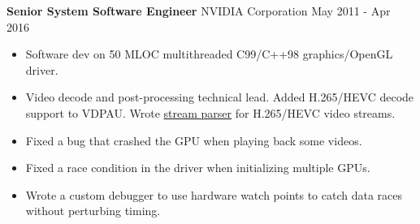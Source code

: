 \textbf{Senior System Software Engineer} NVIDIA Corporation \hfill May 2011 - Apr 2016

\begin{itemize} \itemsep -2pt

\item Software dev on 50 MLOC multithreaded C99/C++98 graphics/OpenGL driver.

\item Video decode and post-processing technical lead. Added H.265/HEVC decode
      support to VDPAU. Wrote
      \href{https://github.com/NVIDIA/vdpau-hevc-example}{stream parser}
      for H.265/HEVC video streams.

\item Fixed a bug that crashed the GPU when playing back some videos.

\item Fixed a race condition in the driver when initializing multiple GPUs.

\item Wrote a custom debugger to use hardware watch points to catch data races without
      perturbing timing.



\end{itemize}
